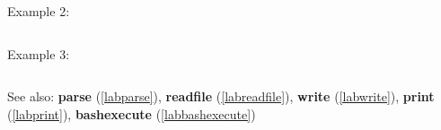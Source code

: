 \noindent Example 2: 
\begin{center}\begin{minipage}{15cm}\begin{Verbatim}[frame=single]
\end{Verbatim}
\end{minipage}\end{center}
\noindent Example 3: 
\begin{center}\begin{minipage}{15cm}\begin{Verbatim}[frame=single]
\end{Verbatim}
\end{minipage}\end{center}
See also: \textbf{parse} (\ref{labparse}), \textbf{readfile} (\ref{labreadfile}), \textbf{write} (\ref{labwrite}), \textbf{print} (\ref{labprint}), \textbf{bashexecute} (\ref{labbashexecute})
